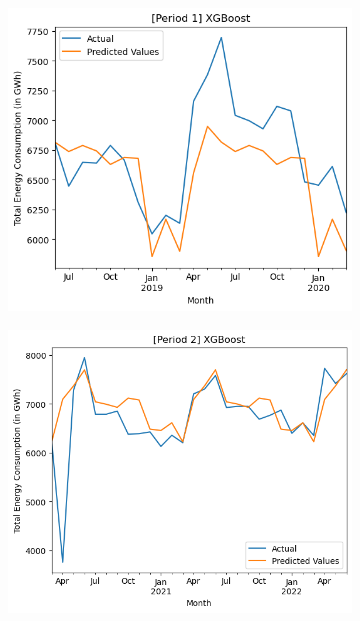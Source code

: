 \documentclass[runningheads]{llncs}
\begin{document}
\begin{center}
    \begin{figure}[h]
    \begin{subfigure}[h]{0.6\textwidth}
         \centering
         \hspace*{-1.3in}
         \includegraphics[width=\textwidth]{results/xgboost/p1.png}
         \caption{}
         \label{fig:resultXGB-p1}
    \end{subfigure}
    \begin{subfigure}[h]{0.6\textwidth}
         \centering
         \hspace*{-1.3in}
         \includegraphics[width=\textwidth]{results/xgboost/p2.png}

\end{subfigure}
\end{figure}
\end{center}
\end{document}
